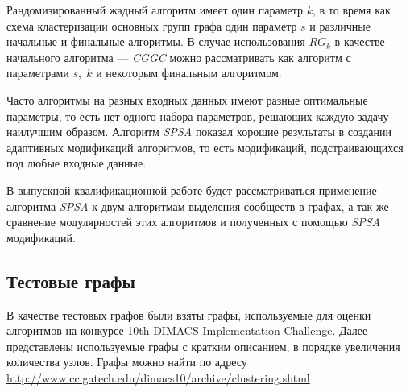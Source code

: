 Рандомизированный жадный алгоритм имеет один параметр $k$, в то время как схема кластеризации основных групп графа один параметр $s$ и различные начальные и финальные алгоритмы. В случае использования $RG_k$ в качестве начального алгоритма --- \emph{CGGC} можно рассматривать как алгоритм с параметрами $s,\;k$ и некоторым финальным алгоритмом.

Часто алгоритмы на разных входных данных имеют разные оптимальные параметры, то есть нет одного набора параметров, решающих каждую задачу наилучшим образом. Алгоритм \emph{SPSA} показал хорошие результаты в создании адаптивных модификаций алгоритмов, то есть модификаций, подстраивающихся под любые входные данные.

В выпускной квалификационной работе будет рассматриваться применение алгоритма \emph{SPSA} к двум алгоритмам выделения сообществ в графах, а так же сравнение модулярностей этих алгоритмов и полученных с помощью \emph{SPSA} модификаций.



\subsection{Тестовые графы}

В качестве тестовых графов были взяты графы, используемые для оценки алгоритмов на конкурсе 10th DIMACS Implementation Challenge. Далее представлены используемые графы с кратким описанием, в порядке увеличения количества узлов. Графы можно найти по адресу \url{http://www.cc.gatech.edu/dimacs10/archive/clustering.shtml}

